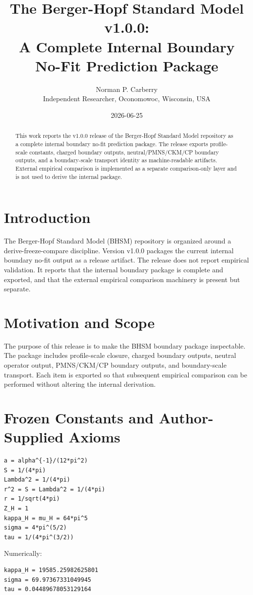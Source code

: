 \documentclass[11pt]{article}
\title{The Berger-Hopf Standard Model v1.0.0:\\A Complete Internal Boundary No-Fit Prediction Package}
\author{Norman P. Carberry\\Independent Researcher, Oconomowoc, Wisconsin, USA}
\date{2026-06-25}
\begin{document}
\maketitle

\begin{abstract}
This work reports the v1.0.0 release of the Berger-Hopf Standard Model repository as a complete internal boundary no-fit prediction package. The release exports profile-scale constants, charged boundary outputs, neutral/PMNS/CKM/CP boundary outputs, and a boundary-scale transport identity as machine-readable artifacts. External empirical comparison is implemented as a separate comparison-only layer and is not used to derive the internal package.
\end{abstract}

\section{Introduction}
The Berger-Hopf Standard Model (BHSM) repository is organized around a derive-freeze-compare discipline. Version v1.0.0 packages the current internal boundary no-fit output as a release artifact. The release does not report empirical validation. It reports that the internal boundary package is complete and exported, and that the external empirical comparison machinery is present but separate.

\section{Motivation and Scope}
The purpose of this release is to make the BHSM boundary package inspectable. The package includes profile-scale closure, charged boundary outputs, neutral operator output, PMNS/CKM/CP boundary outputs, and boundary-scale transport. Each item is exported so that subsequent empirical comparison can be performed without altering the internal derivation.

\section{Frozen Constants and Author-Supplied Axioms}
\begin{verbatim}
a = alpha^{-1}/(12*pi^2)
S = 1/(4*pi)
Lambda^2 = 1/(4*pi)
r^2 = S = Lambda^2 = 1/(4*pi)
r = 1/sqrt(4*pi)
Z_H = 1
kappa_H = mu_H = 64*pi^5
sigma = 4*pi^(5/2)
tau = 1/(4*pi^(3/2))
\end{verbatim}

Numerically:
\begin{verbatim}
kappa_H = 19585.25982625801
sigma = 69.97367331049945
tau = 0.04489678053129164
\end{verbatim}
\end{document}
